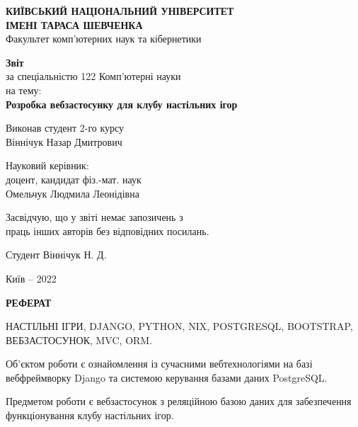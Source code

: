 \documentclass[a4paper, 14pt]{extarticle}
\begin{document}

  \begin{titlepage}
    \begin{center}
      \textbf{КИЇВСЬКИЙ НАЦІОНАЛЬНИЙ УНІВЕРСИТЕТ} \\
      \textbf{ІМЕНІ ТАРАСА ШЕВЧЕНКА} \\
      Факультет комп'ютерних наук та кібернетики \vspace{5em}

      \textbf{Звіт} \\
      за спеціальністю 122 Комп'ютерні науки \\
      на тему: \\
      \textbf{Розробка вебзастосунку для клубу настільних ігор}
    \end{center}
    \vfill
    \begin{flushleft}
      Виконав студент 2-го курсу \\
      Віннічук Назар Дмитрович \vspace{2em}

      Науковий керівник: \\
      доцент, кандидат фіз.-мат. наук \\
      Омельчук Людмила Леонідівна
    \end{flushleft}
    \begin{flushright}
      Засвідчую, що у звіті немає запозичень з \\
      праць інших авторів без відповідних посилань.

      Студент \hspace{7.25em} Віннічук Н. Д.
    \end{flushright}
    \vspace{5em}
    \begin{center}
      Київ -- 2022
    \end{center}
  \end{titlepage}

  \setcounter{page}{2}

  \begin{center}
    \textbf{РЕФЕРАТ}
  \end{center}

  НАСТІЛЬНІ ІГРИ, DJANGO, PYTHON, NIX, POSTGRESQL,
  BOOTSTRAP, ВЕБЗАСТОСУНОК, MVC, ORM.

  Об'єктом роботи є ознайомлення із сучасними вебтехнологіями на базі вебфреймворку
  Django та системою керування базами даних PostgreSQL.

  Предметом роботи є вебзастосунок з реляційною базою даних для забезпечення
  функціонування клубу настільних ігор.
\end{document}
